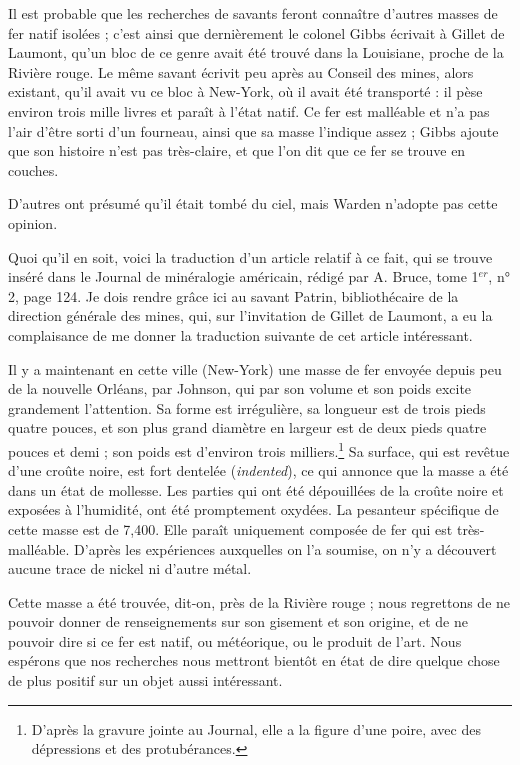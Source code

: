 \documentclass[a4paper, 12pt, oneside, french]{article}
\begin{document}
Il est probable que les recherches de savants feront connaître d'autres masses de fer natif isolées ; c'est ainsi que dernièrement le colonel Gibbs écrivait à Gillet de Laumont, qu'un bloc de ce genre avait été trouvé dans la Louisiane, proche de la Rivière rouge. Le même savant écrivit peu après au Conseil des mines, alors existant, qu'il avait vu ce bloc à New-York, où il avait été transporté : il pèse environ trois mille livres et paraît à l'état natif. Ce fer est malléable et n'a pas l'air d'être sorti d'un fourneau, ainsi que sa masse l'indique assez ; Gibbs ajoute que son histoire n'est pas très-claire, et que l'on dit que ce fer se trouve en couches.

D'autres ont présumé qu'il était tombé du ciel, mais Warden n'adopte pas cette opinion.

Quoi qu'il en soit, voici la traduction d'un article relatif à ce fait, qui se trouve inséré dans le Journal de minéralogie américain, rédigé par A. Bruce, tome 1$^{er}$, n° 2, page 124. Je dois rendre grâce ici au savant Patrin, bibliothécaire de la direction générale des mines, qui, sur l'invitation de Gillet de Laumont, a eu la complaisance de me donner la traduction suivante de cet article intéressant.

\og Il y a maintenant en cette ville (New-York) une masse de fer envoyée depuis peu de la nouvelle Orléans, par Johnson, qui par son volume et son poids excite grandement l'attention. Sa forme est irrégulière, sa longueur est de trois pieds quatre pouces, et son plus grand diamètre en largeur est de deux pieds quatre pouces et demi ; son poids est d'environ trois milliers.\footnote{D'après la gravure jointe au Journal, elle a la figure d'une poire, avec des dépressions et des protubérances.} Sa surface, qui est revêtue d'une croûte noire, est fort dentelée (\emph{indented}), ce qui annonce que la masse a été dans un état de mollesse. Les parties qui ont été dépouillées de la croûte noire et exposées à l'humidité, ont été promptement oxydées. La pesanteur spécifique de cette masse est de 7,400. Elle paraît uniquement composée de fer qui est très-malléable. D'après les expériences auxquelles on l'a soumise, on n'y a découvert aucune trace de nickel ni d'autre métal. \fg

\og Cette masse a été trouvée, dit-on, près de la Rivière rouge ; nous regrettons de ne pouvoir donner de renseignements sur son gisement et son origine, et de ne pouvoir dire si ce fer est natif, ou météorique, ou le produit de l'art. Nous espérons que nos recherches nous mettront bientôt en état de dire quelque chose de plus positif sur un objet aussi intéressant. \fg
\end{document}
